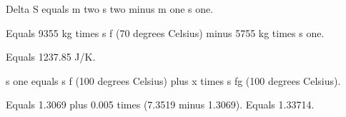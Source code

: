 Delta S equals m two s two minus m one s one.  

Equals 9355 kg times s f (70 degrees Celsius) minus 5755 kg times s one.  

Equals 1237.85 J/K.  

s one equals s f (100 degrees Celsius) plus x times s fg (100 degrees Celsius).  

Equals 1.3069 plus 0.005 times (7.3519 minus 1.3069).  
Equals 1.33714.